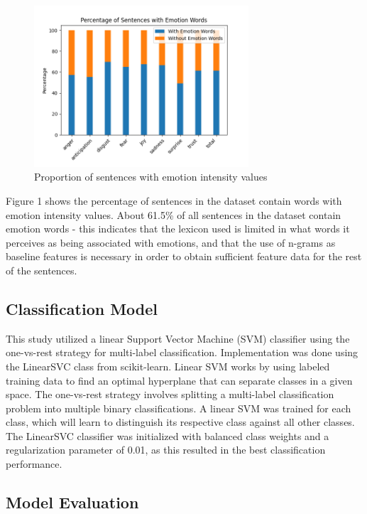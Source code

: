 \documentclass[journal]{./IEEE/IEEEtran}
\begin{document}
\begin{figure}[h!]
    \centering
    \includegraphics[width=8cm]{./images/emopct.png}
    \caption{Proportion of sentences with emotion intensity values}
    \label{fig:chart}
\end{figure}

Figure 1 shows the percentage of sentences in the dataset contain words with emotion intensity values. About 61.5\% of all sentences in the dataset contain emotion words - this indicates that the lexicon used is limited in what words it perceives as being associated with emotions, and that the use of n-grams as baseline features is necessary in order to obtain sufficient feature data for the rest of the sentences.

\subsection{Classification Model}
This study utilized a linear Support Vector Machine (SVM) classifier using the one-vs-rest strategy for multi-label classification. Implementation was done using the LinearSVC class from scikit-learn. Linear SVM works by using labeled training data to find an optimal hyperplane that can separate classes in a given space\cite{Shalev1}. The one-vs-rest strategy involves splitting a multi-label classification problem into multiple binary classifications\cite{Brownlee1}. A linear SVM was trained for each class, which will learn to distinguish its respective class against all other classes. The LinearSVC classifier was initialized with balanced class weights and a regularization parameter of 0.01, as this resulted in the best classification performance.

\subsection{Model Evaluation}
\end{document}
